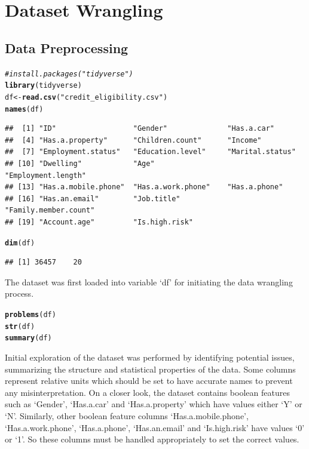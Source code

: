 \documentclass{article}\usepackage[]{graphicx}\usepackage[]{xcolor}
\makeatletter
\newcommand{\hlsng}[1]{\textcolor[rgb]{0.192,0.494,0.8}{#1}}%
\newcommand{\hlcom}[1]{\textcolor[rgb]{0.678,0.584,0.686}{\textit{#1}}}%
\newcommand{\hldef}[1]{\textcolor[rgb]{0.345,0.345,0.345}{#1}}%
\newcommand{\hlkwb}[1]{\textcolor[rgb]{0.69,0.353,0.396}{#1}}%
\newcommand{\hlkwd}[1]{\textcolor[rgb]{0.737,0.353,0.396}{\textbf{#1}}}%
\newenvironment{kframe}{%
 \def\at@end@of@kframe{}%
 \ifinner\ifhmode%
  \def\at@end@of@kframe{\end{minipage}}%
  \begin{minipage}{\columnwidth}%
 \fi\fi%
 \def\FrameCommand##1{\hskip\@totalleftmargin \hskip-\fboxsep
 \colorbox{shadecolor}{##1}\hskip-\fboxsep
     \hskip-\linewidth \hskip-\@totalleftmargin \hskip\columnwidth}%
 \MakeFramed {\advance\hsize-\width
   \@totalleftmargin\z@ \linewidth\hsize
   \@setminipage}}%
 {\par\unskip\endMakeFramed%
 \at@end@of@kframe}
\newenvironment{knitrout}{}{} %
\makeatother
\begin{document}
\section{Dataset Wrangling}

\subsection{Data Preprocessing}

\begin{knitrout}
\color{fgcolor}\begin{kframe}
\begin{alltt}
\hlcom{#install.packages("tidyverse")}
\hlkwd{library}\hldef{(tidyverse)}
\hldef{df} \hlkwb{<-} \hlkwd{read.csv}\hldef{(}\hlsng{"credit_eligibility.csv"}\hldef{)}
\hlkwd{names}\hldef{(df)}
\end{alltt}
\begin{verbatim}
##  [1] "ID"                  "Gender"              "Has.a.car"          
##  [4] "Has.a.property"      "Children.count"      "Income"             
##  [7] "Employment.status"   "Education.level"     "Marital.status"     
## [10] "Dwelling"            "Age"                 "Employment.length"  
## [13] "Has.a.mobile.phone"  "Has.a.work.phone"    "Has.a.phone"        
## [16] "Has.an.email"        "Job.title"           "Family.member.count"
## [19] "Account.age"         "Is.high.risk"
\end{verbatim}
\begin{alltt}
\hlkwd{dim}\hldef{(df)}
\end{alltt}
\begin{verbatim}
## [1] 36457    20
\end{verbatim}
\end{kframe}
\end{knitrout}

The dataset was first loaded into variable `df' for initiating the data wrangling process. 

\begin{knitrout}
\color{fgcolor}\begin{kframe}
\begin{alltt}
\hlkwd{problems}\hldef{(df)}
\hlkwd{str}\hldef{(df)}
\hlkwd{summary}\hldef{(df)}
\end{alltt}
\end{kframe}
\end{knitrout}

Initial exploration of the dataset was performed by identifying potential issues, summarizing the structure and statistical properties of the data. Some columns represent relative units which should be set to have accurate names to prevent any misinterpretation. On a closer look, the dataset contains boolean features such as `Gender', `Has.a.car' and `Has.a.property' which have values either `Y' or `N'. Similarly, other boolean feature columns `Has.a.mobile.phone', `Has.a.work.phone', `Has.a.phone', `Has.an.email' and `Is.high.risk' have values `0' or `1'. So these columns must be handled appropriately to set the correct values.
\end{document}
